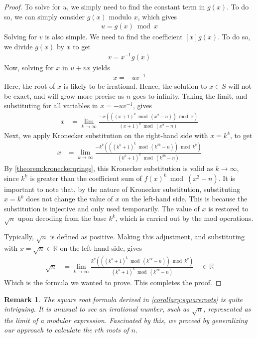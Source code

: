 \documentclass[11pt,reqno]{article}
\theoremstyle{plain}
\newtheorem{remark}{Remark}
\theoremstyle{definition}
\begin{document}
\begin{proof}
To solve for $u$, we simply need to find the constant term in $g(x)$. To do so, we can simply consider $g(x)$ modulo $x$, which gives
\begin{align*}
u = g(x) \bmod{x}
\end{align*}
Solving for $v$ is also simple. We need to find the coefficient $[x] g(x)$. To do so, we divide $g(x)$ by $x$ to get
\begin{align*}
v = x^{-1} g(x)
\end{align*}
Now, solving for $x$ in $u + v x$ yields
\begin{align*}
x = -u v^{-1}
\end{align*}
Here, the root of $x$ is likely to be irrational. Hence, the solution to $x \in S$ will not be exact, and will grow more precise as $n$ goes to infinity. Taking the limit, and substituting for all variables in $x = -u v^{-1}$, gives
\begin{align*}
x &= \lim_{k\rightarrow\infty}
    \frac{-x (((x + 1)^k \bmod{(x^2-n)}) \bmod{x})}
        {(x + 1)^k \bmod{(x^2-n)}}
\end{align*}
Next, we apply Kronecker substitution on the right-hand side with $x = k^k$, to get
\begin{align*}
x &= \lim_{k\rightarrow\infty}
    \frac{-k^k (((k^k + 1)^k \bmod{(k^{2k}-n)}) \bmod{k^k})}
        {(k^k + 1)^k \bmod{(k^{2k}-n)}}
\end{align*}
By \cref{theorem:kroneckerqrings}, this Kronecker substitution is valid as $k\rightarrow\infty$, since $k^k$ is greater than the coefficient sum of $f(x)^k \bmod{(x^2-n)}$. It is important to note that, by the nature of Kronecker substitution, substituting $x=k^k$ does not change the value of $x$ on the left-hand side. This is because the substitution is injective and only used temporarily. The value of $x$ is restored to $\sqrt{n}$ upon decoding from the base $k^k$, which is carried out by the mod operations.

Typically, $\sqrt{n}$ is defined as positive. Making this adjustment, and substituting with $x = \sqrt{n} \in \mathbb{R}$ on the left-hand side, gives
\begin{align*}
\sqrt{n} &= \lim_{k\rightarrow\infty}
    \frac{k^k (((k^k + 1)^k \bmod{(k^{2k}-n)}) \bmod{k^k})}
        {(k^k + 1)^k \bmod{(k^{2k}-n)}}  \quad \in \mathbb{R}
\end{align*}
Which is the formula we wanted to prove. This completes the proof.
\end{proof}

\begin{remark}
The square root formula derived in \cref{corollary:squareroots} is quite intriguing. It is unusual to see an irrational number, such as $\sqrt{n}$, represented as the limit of a modular expression. Fascinated by this, we proceed by generalizing our approach to calculate the $r$th roots of $n$.    
\end{remark}
\end{document}
